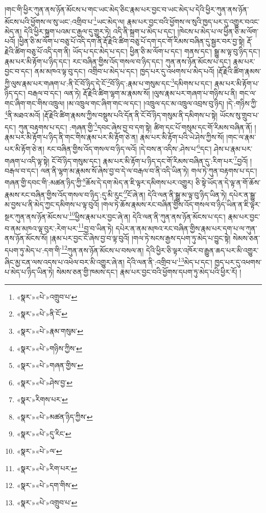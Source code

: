 །གང་གི་ཕྱིར་ཀུན་ནས་ཉོན་མོངས་པ་གང་ཡང་མེད་ཅིང་རྣམ་པར་བྱང་བ་ཡང་མེད་པ་དེའི་ཕྱིར་ཀུན་ནས་ཉོན་མོངས་པའི་ཕྱོགས་ལ་སུ་ཡང་:འགྲིབ་པ་\footnote{«སྣར་»«པེ་»འགྲུབ་པ་}ཡང་མེད་ལ། རྣམ་པར་བྱང་བའི་ཕྱོགས་ལ་སུའི་ཁྱད་པར་དུ་འགྱུར་བའང་མེད་ན། དེའི་ཕྱིར་སྐྲག་པའམ་ང་རྒྱལ་དུ་གྱུར་ཏེ། འདི་ནི་སྐྲག་པ་མེད་པ་དང་། །ཁེངས་པ་མེད་པ་ལ་ཕྱིན་ཅི་མ་ལོག་པའོ། །ཕྱིན་ཅི་མ་ལོག་པ་བཅུ་པོ་འདི་དག་ནི་རྡོ་རྗེའི་ཚིག་བཅུ་པོ་དག་དང་གོ་རིམས་བཞིན་དུ་སྦྱར་བར་བྱ་སྟེ། རྡོ་རྗེའི་ཚིག་བཅུ་པོ་འདི་དག་ནི། ཡོད་པ་དང་མེད་པ་དང་། ཕྱིན་ཅི་མ་ལོག་པ་དང་། གནས་དང་། སྒྱུ་མ་ལྟ་བུ་ཉིད་དང་། རྣམ་པར་མི་རྟོག་པ་ཉིད་དང་། རང་བཞིན་གྱིས་འོད་གསལ་བ་ཉིད་དང་། ཀུན་ནས་ཉོན་མོངས་པ་དང་། རྣམ་པར་བྱང་བ་དང་། ནམ་མཁའ་ལྟ་བུ་དང་། འགྲིབ་པ་མེད་པ་དང་། ཁྱད་པར་དུ་འཕགས་པ་མེད་པའོ། །རྡོ་རྗེའི་ཚིག་རྣམས་ཀྱི་ལུས་རྣམ་པར་གཞག་པ་:ནི་ངོ་བོ་ཉིད་དེ་ངོ་\footnote{«སྣར་»«པེ་»ནི་ངོ་}བོ་ཉིད་:རྣམ་པ་གསུམ་དང་\footnote{«སྣར་»«པེ་»རྣམ་གསུམ་}དམིགས་པ་དང་། རྣམ་པར་མི་རྟོག་པ་ཉིད་དང་། བརྒལ་བ་དང་། ལན་ཏེ། རྡོ་རྗེའི་ཚིག་ལྷག་མ་རྣམས་སོ། །ལུས་རྣམ་པར་གཞག་པ་གཉིས་པ་ནི། གང་ལ་གང་ཞིག་གང་གིས་འཁྲུལ། །མ་འཁྲུལ་གང་ཞིག་གང་ལ་དང་། །འཁྲུལ་དང་མ་འཁྲུལ་འབྲས་བུ་ཉིད། །དེ་:གཉིས་ཀྱི་\footnote{«སྣར་»«པེ་»གཉིས་ཀྱིས་}ནི་མཐའ་མའོ། །རྡོ་རྗེའི་ཚིག་རྣམས་ཀྱིས་བསྡུས་པའི་དོན་ནི་ངོ་བོ་ཉིད་གསུམ་ནི་དམིགས་པ་སྟེ། ཡོངས་སུ་གྲུབ་པ་དང་། ཀུན་བརྟགས་པ་དང་། :གཞན་གྱི་\footnote{«སྣར་»«པེ་»གཞན་གྱིས་}དབང་ཞེས་བྱ་བ་དག་སྟེ། ཚིག་དང་པོ་གསུམ་དང་གོ་རིམས་བཞིན་ནོ། །རྣམ་པར་མི་རྟོག་པ་ཉིད་ནི་གང་གིས་རྣམ་པར་མི་རྟོག་ཅེ་ན། རྣམ་པར་མི་རྟོག་པའི་ཡེ་ཤེས་ཀྱིས་སོ། །གང་ལ་རྣམ་པར་མི་རྟོག་ཅེ་ན། རང་བཞིན་གྱིས་འོད་གསལ་བ་ཉིད་ལའོ། །དེ་བས་ན་འདིས་:ཤེས་པ་\footnote{«སྣར་»«པེ་»ཤེས་བྱ་}དང་། ཤེས་པ་རྣམ་པར་གཞག་པ་འདི་ལྟ་སྟེ། ངོ་བོ་ཉིད་གསུམ་དང་། རྣམ་པར་མི་རྟོག་པ་ཉིད་དང་གོ་རིམས་བཞིན་དུ་:རིག་པར་\footnote{«སྣར་»རིགས་པར་}བྱའོ། །བརྒལ་བ་དང་། ལན་ནི་ལྷག་མ་རྣམས་སོ་ཞེས་བྱ་བ་དེ་ལ་བརྒལ་བ་ནི་འདི་ཡིན་ཏེ། གལ་ཏེ་ཀུན་བརྟགས་པ་དང་། གཞན་གྱི་དབང་གི་:མཚན་ཉིད་ཀྱི་\footnote{«སྣར་»«པེ་»མཚན་ཉིད་ཀྱིས་}ཆོས་དེ་དག་མེད་ན་ཇི་ལྟར་དམིགས་པར་འགྱུར། ཅི་སྟེ་ཡོད་ན་དེ་ལྟ་ན་གོ་ཆོས་རྣམས་རང་བཞིན་གྱིས་འོད་གསལ་བ་ཉིད་:དུ་མི་རུང་\footnote{«སྣར་»«པེ་»དུ་རིང་}ངོ་ཞེ་ན། དེའི་ལན་ནི་སྒྱུ་མ་ལྟ་བུ་ཉིད་ཡིན་ཏེ། དཔེར་ན་སྒྱུ་མ་བྱས་པ་ནི་མེད་ཀྱང་དམིགས་པ་ལྟ་བུའོ། །གལ་ཏེ་ཆོས་རྣམས་རང་བཞིན་གྱིས་འོད་གསལ་བ་ཉིད་ཡིན་ན་ཇི་ལྟར་སྔར་ཀུན་ནས་ཉོན་མོངས་པ་\footnote{«སྣར་»«པེ་»ལ་}ཕྱིས་རྣམ་པར་བྱང་ཞེ་ན། དེའི་ལན་ནི་ཀུན་ནས་ཉོན་མོངས་པ་དང་། རྣམ་པར་བྱང་བ་ནམ་མཁའ་ལྟ་བུར་:རེག་པར་\footnote{«སྣར་»«པེ་»རིག་པར་}བྱ་བ་ཡིན་ཏེ། དཔེར་ན་ནམ་མཁའ་རང་བཞིན་གྱིས་རྣམ་པར་དག་པ་ལ་ཀུན་ནས་ཉོན་མོངས་སོ། །རྣམ་པར་བྱང་ངོ་ཞེས་བྱ་བ་ལྟ་བུའོ། །གལ་ཏེ་སངས་རྒྱས་དཔག་ཏུ་མེད་པ་བྱུང་སྟེ། སེམས་ཅན་དཔག་ཏུ་མེད་པ་:དག་གི་\footnote{«སྣར་»«པེ་»དག་གིས་}ཀུན་ནས་ཉོན་མོངས་པ་བསལ་ན། དེའི་ཕྱིར་ཅི་ལྟར་འཁོར་བ་རྒྱུན་ཆད་པར་མི་འགྱུར་ཞིང་མྱ་ངན་ལས་འདས་པ་འཕེལ་བར་མི་འགྱུར་ཞེ་ན། དེའི་ལན་ནི་:འགྲིབ་པ་\footnote{«སྣར་»«པེ་»འགྲུབ་པ་}མེད་པ་དང་། ཁྱད་པར་དུ་འཕགས་པ་མེད་པ་ཉིད་ཡིན་ཏེ། སེམས་ཅན་གྱི་ཁམས་དང་། རྣམ་པར་བྱང་བའི་ཕྱོགས་དཔག་ཏུ་མེད་པའི་ཕྱིར་རོ། །
